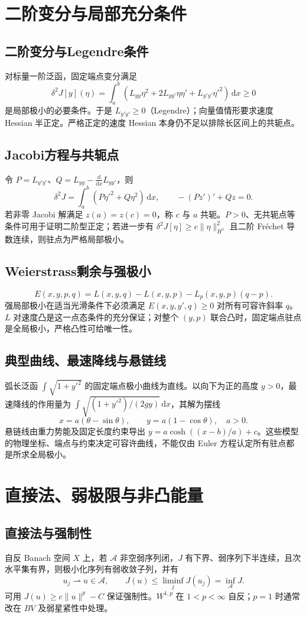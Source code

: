 \documentclass[../main.tex]{subfiles}
\begin{document}
\section{二阶变分与局部充分条件}
\subsection{二阶变分与Legendre条件}
对标量一阶泛函，固定端点变分满足
\[
\delta^2J[y](\eta)=\int_a^b\left(L_{yy}\eta^2+2L_{yy'}\eta\eta'+L_{y'y'}\eta'^2\right)\,\mathrm dx\ge0
\]
是局部极小的必要条件。于是 $L_{y'y'}\ge0$（Legendre）；向量值情形要求速度 Hessian 半正定。严格正定的速度 Hessian 本身仍不足以排除长区间上的共轭点。
\subsection{Jacobi方程与共轭点}
令 $P=L_{y'y'}$、$Q=L_{yy}-\frac{\mathrm d}{\mathrm dx}L_{yy'}$，则
\[
\delta^2J=\int_a^b(P\eta'^2+Q\eta^2)\,\mathrm dx,\qquad
-(Pz')'+Qz=0.
\]
若非零 Jacobi 解满足 $z(a)=z(c)=0$，称 $c$ 与 $a$ 共轭。$P>0$、无共轭点等条件可用于证明二阶型正定；若进一步有 $\delta^2J[\eta]\ge c\|\eta\|_{H^1}^2$ 且二阶 Fréchet 导数连续，则驻点为严格局部极小。
\subsection{Weierstrass剩余与强极小}
\[
E(x,y,p,q)=L(x,y,q)-L(x,y,p)-L_p(x,y,p)(q-p).
\]
强局部极小在适当光滑条件下必须满足 $E(x,y,y',q)\ge0$ 对所有可容许斜率 $q$。$L$ 对速度凸是这一点态条件的充分保证；对整个 $(y,p)$ 联合凸时，固定端点驻点是全局极小，严格凸性可给唯一性。
\subsection{典型曲线、最速降线与悬链线}
弧长泛函 $\int\sqrt{1+y'^2}$ 的固定端点极小曲线为直线。以向下为正的高度 $y>0$，最速降线的作用量为 $\int\sqrt{(1+y'^2)/(2gy)}\,\mathrm dx$，其解为摆线
\[
x=a(\theta-\sin\theta),\qquad y=a(1-\cos\theta),\quad a>0.
\]
悬链线由重力势能及固定长度约束导出 $y=a\cosh((x-b)/a)+c$。这些模型的物理坐标、端点与约束决定可容许曲线，不能仅由 Euler 方程认定所有驻点都是所求全局极小。
\section{直接法、弱极限与非凸能量}
\subsection{直接法与强制性}
自反 Banach 空间 $X$ 上，若 $\mathcal A$ 非空弱序列闭，$J$ 有下界、弱序列下半连续，且次水平集有界，则极小化序列有弱收敛子列，并有
\[
u_j\rightharpoonup u\in\mathcal A,\qquad
J(u)\le\liminf_jJ(u_j)=\inf_{\mathcal A}J.
\]
可用 $J(u)\ge c\|u\|^p-C$ 保证强制性。$W^{1,p}$ 在 $1<p<\infty$ 自反；$p=1$ 时通常改在 $BV$ 及弱星紧性中处理。
\end{document}
